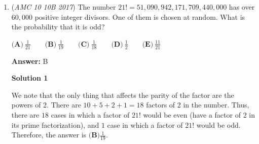 \begin{enumerate}
 
            \begin{itemize}
        \item $x_C = x_B + 3(x_B - x_A)$
        \item $y_C = y_B + 3(y_B - y_A)$
            \end{itemize}
            Calculating our new vertices $A'$, $B'$, and $C'$:

 
            \begin{itemize}
        \item $B' = (1 + 3(1 - 0), 0 + 3(0 - 0)) = (4,0)$
        \item $C' = (\frac{1}{2} + 3(\frac{1}{2} - 1), \frac{\sqrt{3}}{2} + 3(\frac{\sqrt{3}}{2} - 0)) = (-1, 2\sqrt{3})$
        \item $A' = (0 + 3(0 - \frac{1}{2}), 0 + 3(0 - \frac{\sqrt{3}}{2})) = (-\frac{3}{2}, -\frac{3\sqrt{3}}{2})$
            \end{itemize}
            Because we extended every side by the exact same amount, the new large triangle $\triangle A'B'C'$ stays perfectly equilateral. We can find its new side length squared by checking the distance between $B'$ and $C'$:
 \[\text{Side}^2 = (-1 - 4)^2 + (2\sqrt{3} - 0)^2 = 25 + 12 = 37\]

 The area of any equilateral triangle is just $\frac{\sqrt{3}}{4} \times \text{side}^2$. Since our starting triangle had a side length squared of $1$ and our new one has a side length squared of $37$, the new area is exactly $37$ times larger.

 Hence $[\triangle A'B'C']:[\triangle ABC] = \boxed{\textbf{(E) } 37:1}$



	\item (\textit{AMC 10 10B 2017}) The number $21!=51,090,942,171,709,440,000$ has over $60,000$ positive integer divisors. One of them is chosen at random. What is the probability that it is odd?


 $\textbf{(A)}\ \frac{1}{21} \qquad \textbf{(B)}\ \frac{1}{19} \qquad \textbf{(C)}\ \frac{1}{18} \qquad \textbf{(D)}\ \frac{1}{2} \qquad \textbf{(E)}\ \frac{11}{21}$

 \textbf{Answer: }B



\textbf{Solution 1}

We note that the only thing that affects the parity of the factor are the powers of 2. There are $10+5+2+1 = 18$ factors of 2 in the number. Thus, there are $18$ cases in which a factor of $21!$ would be even (have a factor of $2$ in its prime factorization), and $1$ case in which a factor of $21!$ would be odd. Therefore, the answer is $\boxed{\textbf{(B)} \frac 1{19}}$.


\end{enumerate}
